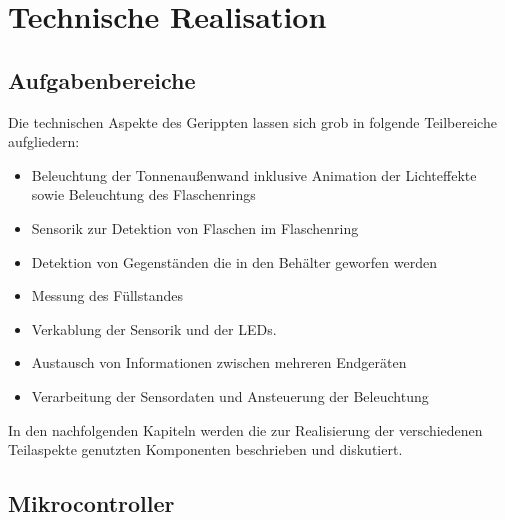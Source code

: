 \chapter{Technische Realisation}

\section{Aufgabenbereiche}












    Die technischen Aspekte des Gerippten lassen sich grob in folgende Teilbereiche aufgliedern:

    \begin{itemize}
        \item Beleuchtung der Tonnenaußenwand inklusive Animation der Lichteffekte sowie Beleuchtung des Flaschenrings
        \item Sensorik zur Detektion von Flaschen im Flaschenring
        \item Detektion von Gegenständen die in den Behälter geworfen werden
        \item Messung des Füllstandes
        \item Verkablung der Sensorik und der LEDs.
        \item Austausch von Informationen zwischen mehreren Endgeräten
        \item Verarbeitung der Sensordaten und Ansteuerung der Beleuchtung
    \end{itemize}

    In den nachfolgenden Kapiteln werden die zur Realisierung der verschiedenen Teilaspekte genutzten Komponenten beschrieben und diskutiert.


\section{Mikrocontroller}

